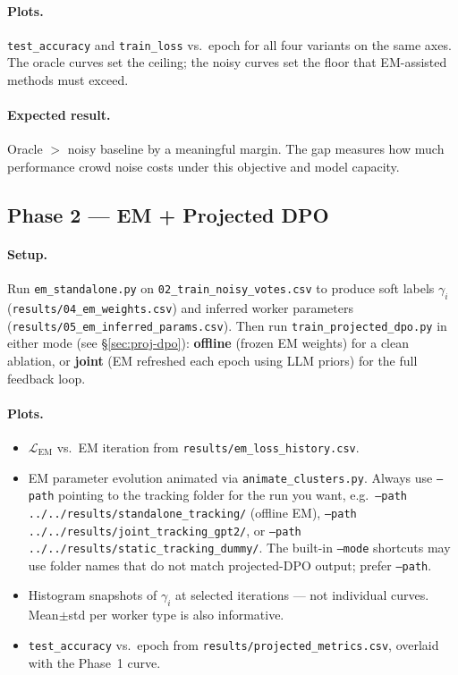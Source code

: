 \documentclass[11pt, a4paper]{article}
\begin{document}
\paragraph{Plots.} \texttt{test\_accuracy} and \texttt{train\_loss} vs.\ epoch for all
four variants on the same axes. The oracle curves set the ceiling; the noisy curves set
the floor that EM-assisted methods must exceed.

\paragraph{Expected result.}
Oracle $>$ noisy baseline by a meaningful margin. The gap measures how much performance
crowd noise costs under this objective and model capacity.

\subsection{Phase 2 --- EM + Projected DPO}

\paragraph{Setup.}
Run \texttt{em\_standalone.py} on \texttt{02\_train\_noisy\_votes.csv} to produce
soft labels $\gamma_i$ (\texttt{results/04\_em\_weights.csv}) and inferred worker
parameters (\texttt{results/05\_em\_inferred\_params.csv}). Then run
\texttt{train\_projected\_dpo.py} in either mode (see \S\ref{sec:proj-dpo}):
\textbf{offline} (frozen EM weights) for a clean ablation, or \textbf{joint} (EM
refreshed each epoch using LLM priors) for the full feedback loop.

\paragraph{Plots.}
\begin{itemize}[noitemsep]
  \item $\mathcal{L}_\text{EM}$ vs.\ EM iteration from \texttt{results/em\_loss\_history.csv}.
  \item EM parameter evolution animated via \texttt{animate\_clusters.py}. Always use
        \texttt{--path} pointing to the tracking folder for the run you want, e.g.\
        \texttt{--path ../../results/standalone\_tracking/} (offline EM),
        \texttt{--path ../../results/joint\_tracking\_gpt2/}, or
        \texttt{--path ../../results/static\_tracking\_dummy/}.
        The built-in \texttt{--mode} shortcuts may use folder names that do not match
        projected-DPO output; prefer \texttt{--path}.
  \item Histogram snapshots of $\gamma_i$ at selected iterations --- not individual curves.
        Mean$\pm$std per worker type is also informative.
  \item \texttt{test\_accuracy} vs.\ epoch from \texttt{results/projected\_metrics.csv},
        overlaid with the Phase~1 curve.
\end{itemize}
\end{document}
